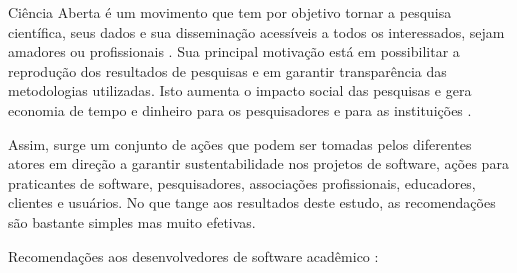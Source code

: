 Ciência Aberta é um movimento que tem por objetivo tornar a pesquisa
científica, seus dados e sua disseminação acessíveis a todos os interessados,
sejam amadores ou profissionais \cite{WikipediaOpenScience}. Sua principal
motivação está em possibilitar a reprodução dos resultados de pesquisas e em
garantir transparência das metodologias utilizadas. Isto aumenta o impacto
social das pesquisas e gera economia de tempo e dinheiro para os pesquisadores
e para as instituições \cite{nesta2010open}.

Assim, surge um conjunto de ações que podem ser tomadas pelos diferentes atores
em direção a garantir sustentabilidade nos projetos de software, ações para
praticantes de software, pesquisadores, associações profissionais, educadores,
clientes e usuários. No que tange aos resultados deste estudo, as recomendações
são bastante simples mas muito efetivas.


Recomendações aos desenvolvedores de software acadêmico \cite{jimenez_four_2017}:

